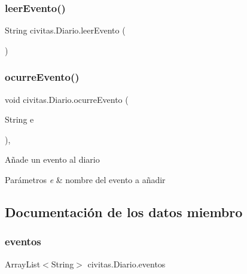 \subsubsection{\texorpdfstring{leer\+Evento()}{leerEvento()}}
{\footnotesize\ttfamily String civitas.\+Diario.\+leer\+Evento (\begin{DoxyParamCaption}{ }\end{DoxyParamCaption})\hspace{0.3cm}{\ttfamily [inline]}}

\mbox{\label{classcivitas_1_1Diario_a7267b21dad18f09ad950d57043d24462}} 
\subsubsection{\texorpdfstring{ocurre\+Evento()}{ocurreEvento()}}
{\footnotesize\ttfamily void civitas.\+Diario.\+ocurre\+Evento (\begin{DoxyParamCaption}\item[{String}]{e }\end{DoxyParamCaption})\hspace{0.3cm}{\ttfamily [inline]}, {\ttfamily [package]}}

Añade un evento al diario 
\begin{DoxyParams}{Parámetros}
{\em e} & nombre del evento a añadir \\
\hline
\end{DoxyParams}


\subsection{Documentación de los datos miembro}
\mbox{\label{classcivitas_1_1Diario_a38a6db28bf50dbcaac2bf60db2afcfd7}} 
\subsubsection{\texorpdfstring{eventos}{eventos}}
{\footnotesize\ttfamily Array\+List$<$String$>$ civitas.\+Diario.\+eventos\hspace{0.3cm}{\ttfamily [private]}}


